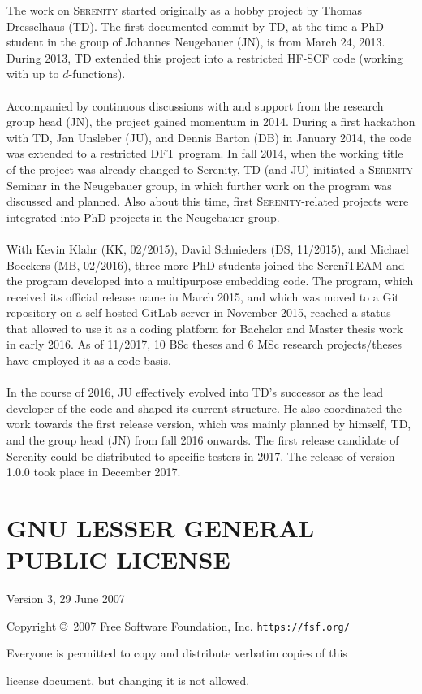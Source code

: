 \documentclass[bibliography=totocnumbered,a4paper,10pt]{scrartcl}
\newcommand{
\serenity}{\textsc{Serenity}\xspace}
\begin{document}
The work on \serenity started originally as a hobby project
by Thomas Dresselhaus (TD). The first
documented commit by TD, at the time a PhD student in the group of
Johannes Neugebauer (JN), is from March 24, 2013. During 2013,
TD extended this project into a restricted HF-SCF code
(working with up to $d$-functions).\\
\\
Accompanied by continuous discussions with and support from the
research group head (JN), the project gained
momentum in 2014. During a first hackathon with TD, Jan Unsleber (JU),
and Dennis Barton (DB) in January 2014, the code was extended to a
restricted DFT program. In fall 2014, when the working title of the
project was already changed to Serenity, TD (and JU) initiated a
\serenity Seminar in the Neugebauer group, in which further work
on the program was discussed and planned. Also about this time,
first \serenity-related projects were integrated into PhD projects
in the Neugebauer group.\\
\\
With Kevin Klahr (KK, 02/2015), David Schnieders (DS, 11/2015), and Michael
Boeckers (MB, 02/2016), three more PhD students joined the SereniTEAM and 
the program developed into a multipurpose embedding code.
The program, which received its official release name in March 2015, and
which was moved to a Git repository on a self-hosted GitLab server in
November 2015, reached a status that allowed to use it as a coding
platform for Bachelor and Master thesis work in early 2016. As of 11/2017,
10 BSc theses and 6 MSc research projects/theses have employed it as
a code basis.\\
\\
In the course of 2016, JU effectively evolved into TD's successor as the
lead developer of the code and shaped its current structure. He also
coordinated the work towards the first release version, which was mainly
planned by himself, TD, and the group head (JN) from fall 2016 onwards.
The first release candidate of Serenity could be distributed to specific
testers in 2017. The release of version 1.0.0 took place in December 2017.


\clearpage
\section{GNU LESSER GENERAL PUBLIC LICENSE}\label{sec:lgpl}
\begin{center}
Version 3, 29 June 2007\\
\end{center}
\begin{center}
{\parindent 0in

Copyright \copyright\  2007 Free Software Foundation, Inc. \texttt{https://fsf.org/}

\bigskip
Everyone is permitted to copy and distribute verbatim copies of this

license document, but changing it is not allowed.}

\end{center}
\end{document}
